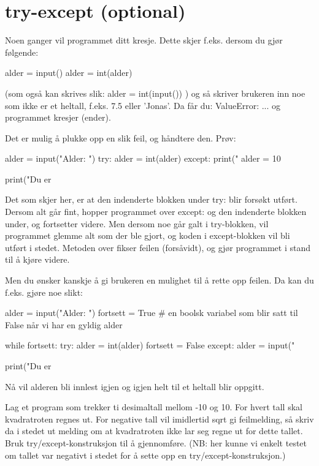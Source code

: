 \section{try-except (optional)}

Noen ganger vil programmet ditt kresje. Dette skjer f.eks. dersom du gjør følgende:
\begin{usncodebox}
alder = input()
alder = int(alder)
\end{usncodebox}

(som også kan skrives slik: alder = int(input()) ) og så skriver brukeren inn noe som ikke er et heltall, f.eks. 7.5 eller 'Jonas'. Da får du: ValueError: ... og programmet kresjer (ender). 

Det er mulig å plukke opp en slik feil, og håndtere den. 
Prøv:
\begin{usncodebox}
alder = input("Alder: ")
try:
    alder = int(alder)
except:
    print("%
    alder = 10 

print("Du er %
\end{usncodebox}
    
Det som skjer her, er at den indenderte blokken under try: blir forsøkt utført. Dersom alt går fint, hopper programmet over except: og den indenderte blokken under, og fortsetter videre. Men dersom noe går galt i try-blokken, vil programmet glemme alt som der ble gjort, og koden i except-blokken vil bli utført i stedet. Metoden over fikser feilen (forsåvidt), og gjør programmet i stand til å kjøre videre. 

Men du ønsker kanskje å gi brukeren en mulighet til å rette opp feilen. Da kan du f.eks. gjøre noe slikt:

\begin{usncodebox}
alder = input("Alder: ")
fortsett = True     # en boolsk variabel som blir satt til False når vi har en gyldig alder

while fortsett: 
    try:
        alder = int(alder)
        fortsett = False
    except:
        alder = input("%

print("Du er %
\end{usncodebox}

Nå vil alderen bli innlest igjen og igjen helt til et heltall blir oppgitt. 

\begin{exercise}
Lag et program som trekker ti desimaltall mellom -10 og 10. For hvert tall skal kvadratroten regnes ut.
For negative tall vil imidlertid sqrt gi feilmelding, så skriv da i stedet ut melding om at kvadratroten ikke lar seg regne ut for dette tallet. Bruk try/except-konstruksjon til å gjennomføre. (NB: her kunne vi enkelt testet om tallet var negativt i stedet for å sette opp en try/except-konstruksjon.)
\end{exercise}

